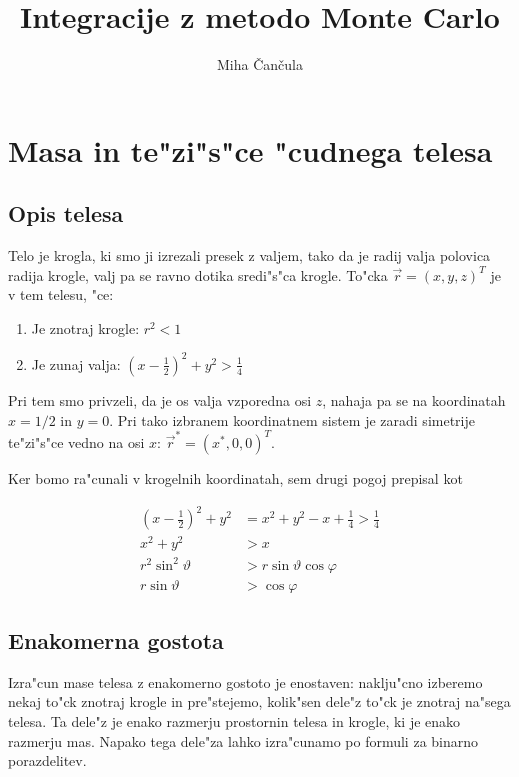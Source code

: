 \documentclass[a4paper,10pt]{article}
\title{Integracije z metodo Monte Carlo}
\author{Miha \v Can\v cula}
\renewcommand{\theta}{\vartheta}
\renewcommand{\phi}{\varphi}
\begin{document}
\maketitle

\section{Masa in te"zi"s"ce "cudnega telesa}

\subsection{Opis telesa}

Telo je krogla, ki smo ji izrezali presek z valjem, tako da je radij valja polovica radija krogle, valj pa se ravno dotika sredi"s"ca krogle. To"cka $\vec r = (x,y,z)^T$ je v tem telesu, "ce:

\begin{enumerate}
 \item Je znotraj krogle: $r^2 < 1$
 \item Je zunaj valja: $(x-\frac{1}{2})^2 + y^2 > \frac{1}{4}$
\end{enumerate}

Pri tem smo privzeli, da je os valja vzporedna osi $z$, nahaja pa se na koordinatah $x=1/2$ in $y=0$. Pri tako izbranem koordinatnem sistem je zaradi simetrije te"zi"s"ce vedno na osi $x$: $\vec r^* = (x^*,0,0)^T$. 

Ker bomo ra"cunali v krogelnih koordinatah, sem drugi pogoj prepisal kot

\begin{align}
 \left(x-\frac{1}{2}\right)^2 + y^2 &= x^2 + y^2 - x + \frac{1}{4} > \frac{1}{4} \\
  x^2 + y^2 &> x \\
  r^2\sin^2\theta &> r\sin\theta\cos\phi \\
  r\sin\theta &> \cos\phi
\end{align}


\subsection{Enakomerna gostota}
Izra"cun mase telesa z enakomerno gostoto je enostaven: naklju"cno izberemo nekaj to"ck znotraj krogle in pre"stejemo, kolik"sen dele"z to"ck je znotraj na"sega telesa. Ta dele"z je enako razmerju prostornin telesa in krogle, ki je enako razmerju mas. Napako tega dele"za lahko izra"cunamo po formuli za binarno porazdelitev. 
\end{document}
